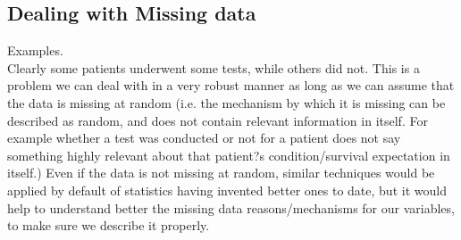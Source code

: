 \documentclass[a4paper]{article}
\begin{document}
\subsection{Dealing with Missing data}
Examples.\cite{little2014statistical} \\
Clearly some patients underwent some tests, while others did not. This is a problem we can deal with in a very robust manner as long as we can assume that the data is missing at random (i.e. the mechanism by which it is missing can be described as random, and does not contain relevant information in itself. For example whether a test was conducted or not for a patient does not say something highly relevant about that patient?s condition/survival expectation in itself.) Even if the data is not missing at random, similar techniques would be applied by default of statistics having invented better ones to date, but it would help to understand better the missing data reasons/mechanisms for our variables, to make sure we describe it properly.\cite{Garcia-Laencina2015}



\end{document}
